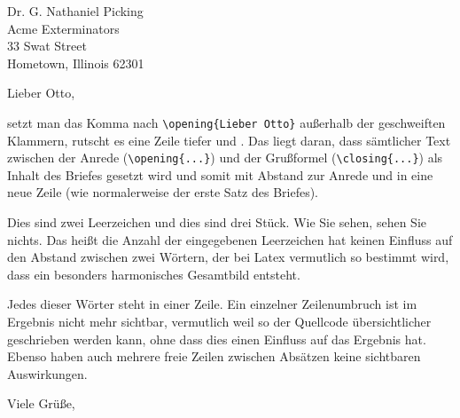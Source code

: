 \documentclass[11pt]{letter}
\begin{document}
\address{Herrn Otto Nielson\\ Großer Onkel-Straße 11\\ 99999 Bullerbü}
\signature{Heidi Hinkelstein \\ Große Kuchenmeisterin}

\begin{letter}{Dr. G. Nathaniel Picking \\
Acme Exterminators\\ 33 Swat Street \\
Hometown, Illinois 62301}

\date{22. Oktober 2014}
\opening{Lieber Otto,}

setzt man das Komma nach \verb-\opening{Lieber Otto}- außerhalb der geschweiften Klammern, rutscht es eine Zeile tiefer und . Das liegt daran, dass sämtlicher Text zwischen der Anrede (\verb#\opening{...}#) und der Grußformel (\verb,\closing{...},) als Inhalt des Briefes gesetzt wird und somit mit Abstand zur Anrede und in eine neue Zeile (wie normalerweise der erste Satz des Briefes).

Dies sind zwei  Leerzeichen und dies sind drei   Stück. Wie Sie sehen, sehen Sie nichts. Das heißt die Anzahl der eingegebenen Leerzeichen hat keinen Einfluss auf den Abstand zwischen zwei Wörtern, der bei Latex vermutlich so bestimmt wird, dass ein besonders harmonisches Gesamtbild entsteht. 

Jedes
dieser
Wörter
steht
in
einer
Zeile.
Ein einzelner Zeilenumbruch ist im Ergebnis nicht mehr sichtbar, vermutlich weil so der Quellcode übersichtlicher geschrieben werden kann, ohne dass dies einen Einfluss auf das Ergebnis hat. Ebenso haben auch mehrere freie Zeilen zwischen Absätzen keine sichtbaren Auswirkungen. 

\closing{Viele Grüße,}
\end{letter}
\end{document}
